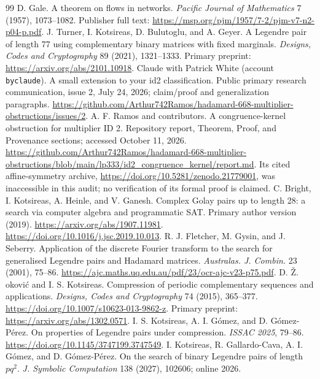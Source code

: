 \documentclass[11pt]{article}
\begin{document}
\begin{thebibliography}{99}
 D. Gale. A theorem on flows in networks.
\emph{Pacific Journal of Mathematics} 7 (1957), 1073--1082.
Publisher full text: \url{https://msp.org/pjm/1957/7-2/pjm-v7-n2-p04-p.pdf}.
 J. Turner, I. Kotsireas, D. Bulutoglu, and A. Geyer.
A Legendre pair of length 77 using complementary binary matrices with fixed
marginals. \emph{Designs, Codes and Cryptography} 89 (2021), 1321--1333.
Primary preprint: \url{https://arxiv.org/abs/2101.10918}.
 Claude with Patrick White (account \texttt{byclaude}).
A small extension to your id2 classification. Public primary research
communication, issue 2, July 24, 2026; claim/proof and generalization paragraphs.
\url{https://github.com/Arthur742Ramos/hadamard-668-multiplier-obstructions/issues/2}.
 A. F. Ramos and contributors.
A congruence-kernel obstruction for multiplier ID 2. Repository report,
Theorem, Proof, and Provenance sections; accessed October 11, 2026.
\url{https://github.com/Arthur742Ramos/hadamard-668-multiplier-obstructions/blob/main/lp333/id2_congruence_kernel/report.md}.
Its cited affine-symmetry archive, \url{https://doi.org/10.5281/zenodo.21779001},
was inaccessible in this audit; no verification of its formal proof is claimed.
 C. Bright, I. Kotsireas, A. Heinle, and V. Ganesh.
Complex Golay pairs up to length 28: a search via computer algebra and
programmatic SAT. Primary author version (2019).
\url{https://arxiv.org/abs/1907.11981}.
\url{https://doi.org/10.1016/j.jsc.2019.10.013}.
 R. J. Fletcher, M. Gysin, and J. Seberry.
Application of the discrete Fourier transform to the search for generalised
Legendre pairs and Hadamard matrices. \emph{Australas. J. Combin.} 23
(2001), 75--86.
\url{https://ajc.maths.uq.edu.au/pdf/23/ocr-ajc-v23-p75.pdf}.
 D. \v{Z}. \DJ{}okovi\'c and I. S. Kotsireas.
Compression of periodic complementary sequences and applications.
\emph{Designs, Codes and Cryptography} 74 (2015), 365--377.
\url{https://doi.org/10.1007/s10623-013-9862-z}.
Primary preprint: \url{https://arxiv.org/abs/1302.0571}.
 I. S. Kotsireas, A. I. G\'omez, and D. G\'omez-P\'erez.
On properties of Legendre pairs under compression.
\emph{ISSAC 2025}, 79--86.
\url{https://doi.org/10.1145/3747199.3747549}.
 I. Kotsireas, R. Gallardo-Cava, A. I. G\'omez, and
D. G\'omez-P\'erez. On the search of binary Legendre pairs of length $pq^2$.
\emph{J. Symbolic Computation} 138 (2027), 102606; online 2026.

\end{thebibliography}
\end{document}
